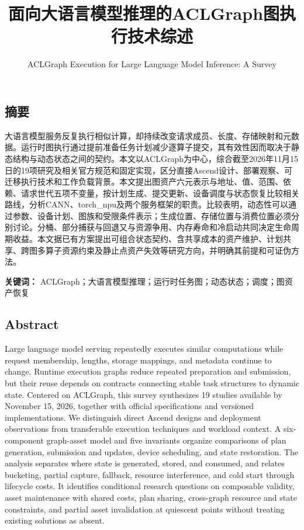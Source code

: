 \documentclass[
  UTF8,
  zihao=5]{ctexart}
\title{面向大语言模型推理的ACLGraph图执行技术综述}
\subtitle{ACLGraph Execution for Large Language Model Inference: A
Survey}
\author{}
\date{}
\begin{document}
\maketitle

\hypertarget{ux6458ux8981}{%
\subsection*{摘要}\label{ux6458ux8981}}

大语言模型服务反复执行相似计算，却持续改变请求成员、长度、存储映射和元数据。运行时图执行通过提前准备任务计划减少逐算子提交，其有效性因而取决于静态结构与动态状态之间的契约。本文以ACLGraph为中心，综合截至2026年11月15日的19项研究及相关官方规范和固定实现，区分直接Ascend设计、部署观察、可迁移执行技术和工作负载背景。本文提出图资产六元表示与地址、值、范围、依赖、请求世代五项不变量，按计划生成、提交更新、设备调度与状态恢复比较相关路线，分析CANN、torch\_npu及两个服务框架的职责。比较表明，动态性可以通过参数、设备计划、图族和受限条件表示；生成位置、存储位置与消费位置必须分别讨论。分桶、部分捕获与回退又与资源争用、内存寿命和冷启动共同决定生命周期收益。本文据已有方案提出可组合状态契约、含共享成本的资产维护、计划共享、跨图多算子资源约束及静止点资产失效等研究方向，并明确其前提和可证伪方法。

\textbf{关键词：}
ACLGraph；大语言模型推理；运行时任务图；动态状态；调度；图资产恢复

\hypertarget{abstract}{%
\subsection*{Abstract}\label{abstract}}

Large language model serving repeatedly executes similar computations
while request membership, lengths, storage mappings, and metadata
continue to change. Runtime execution graphs reduce repeated preparation
and submission, but their reuse depends on contracts connecting stable
task structures to dynamic state. Centered on ACLGraph, this survey
synthesizes 19 studies available by November 15, 2026, together with
official specifications and versioned implementations. We distinguish
direct Ascend designs and deployment observations from transferable
execution techniques and workload context. A six-component graph-asset
model and five invariants organize comparisons of plan generation,
submission and updates, device scheduling, and state restoration. The
analysis separates where state is generated, stored, and consumed, and
relates bucketing, partial capture, fallback, resource interference, and
cold start through lifecycle costs. It identifies conditional research
questions on composable validity, asset maintenance with shared costs,
plan sharing, cross-graph resource and state constraints, and partial
asset invalidation at quiescent points without treating existing
solutions as absent.
\end{document}
